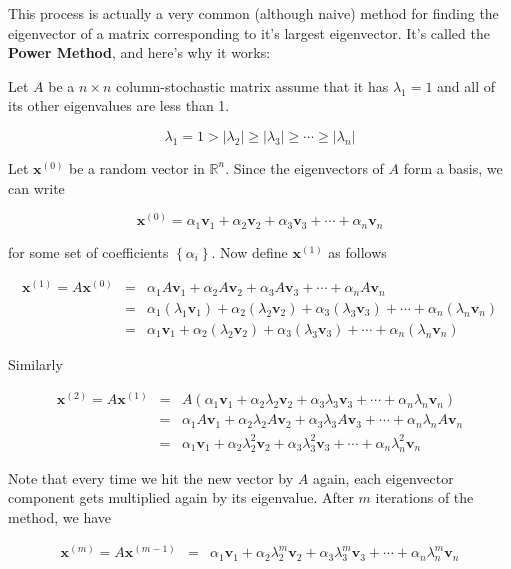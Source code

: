 \documentclass[12pt]{article}
\newcommand{\iter}[1]{^{\myp{#1}}}
\newcommand{\nin}{\noindent}
\newcommand{\nn}{\nonumber}
\newcommand{\vthree}{\vspace{3mm}}
\newcommand{\myp}[1]{\left( #1 \right)}
\newcommand{\mys}[1]{\left\{ #1 \right\}}
\newcommand{\myab}[1]{\left| #1 \right|}
\newcommand{\R}[1]{\mathbb{R}^{#1}}
\newcommand{\beq}{\begin{eqnarray}}
\newcommand{\eeq}{\end{eqnarray}}
\newcommand{\bx}{\mathbf{x}}
\newcommand{\bv}{\mathbf{v}}
\begin{document}
\nin This process is actually a very common (although naive) method for finding the eigenvector of a matrix corresponding to it's largest eigenvector.  It's called the {\bf Power Method}, and here's why it works:

\vthree

\nin Let $A$ be a $n \times n$ column-stochastic matrix assume that it has $\lambda_1 = 1$ and all of its other eigenvalues are less than 1.

\[
\lambda_1 = 1 > \myab{\lambda_2} \geq \myab{\lambda_3} \geq \cdots \geq \myab{\lambda_n}
\]

\vthree

\nin Let $\bx\iter{0}$ be a random vector in $\R{n}$.  Since the eigenvectors of $A$ form a basis, we can write

\[
\bx\iter{0} = \alpha_1 \bv_1 + \alpha_2 \bv_2 + \alpha_3 \bv_3 + \cdots + \alpha_n \bv_n
\]

\vthree

\nin for some set of coefficients $\mys{\alpha_i}$. Now define $\bx\iter{1}$ as follows

\beq
\nn \bx\iter{1} = A\bx\iter{0} &=& \alpha_1 A\bv_1 + \alpha_2 A\bv_2 + \alpha_3 A\bv_3 + \cdots + \alpha_n A\bv_n  \\
\nn &=&  \alpha_1 \myp{\lambda_1\bv_1} + \alpha_2 \myp{\lambda_2\bv_2} + \alpha_3 \myp{\lambda_3\bv_3} + \cdots + \alpha_n \myp{\lambda_n\bv_n} \\
\nn &=&  \alpha_1 \bv_1 + \alpha_2 \myp{\lambda_2\bv_2} + \alpha_3 \myp{\lambda_3\bv_3} + \cdots + \alpha_n \myp{\lambda_n\bv_n}
\eeq

\vthree

\nin Similarly

\beq
\nn \bx\iter{2} = A\bx\iter{1} &=&  A\myp{\alpha_1 \bv_1 + \alpha_2 \lambda_2\bv_2 + \alpha_3 \lambda_3\bv_3 + \cdots + \alpha_n \lambda_n\bv_n} \\
\nn  &=&  \alpha_1 A\bv_1 + \alpha_2 \lambda_2A\bv_2 + \alpha_3 \lambda_3A\bv_3 + \cdots + \alpha_n \lambda_nA\bv_n \\
\nn  &=&  \alpha_1 \bv_1 + \alpha_2 \lambda_2^2\bv_2 + \alpha_3 \lambda_3^2\bv_3 + \cdots + \alpha_n \lambda_n^2\bv_n
\eeq

\vthree

\nin  Note that every time we hit the new vector by $A$ again, each eigenvector component gets multiplied again by its eigenvalue.  After $m$ iterations of the method, we have

\beq
\nn \bx\iter{m} = A\bx\iter{m-1} &=&
\alpha_1 \bv_1 + \alpha_2 \lambda_2^m\bv_2 + \alpha_3 \lambda_3^m\bv_3 + \cdots + \alpha_n \lambda_n^m\bv_n
\eeq
\end{document}
